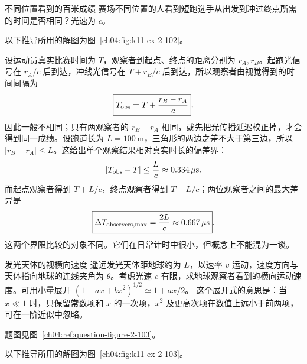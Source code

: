 {\begin{origexamplebox}{不同位置看到的百米成绩}\label{ch04:ex:k11-2-102}
赛场不同位置的人看到短跑选手从出发到冲过终点所需的时间是否相同？光速为 $c$。

\begin{qualityfigure}
\label{mech:04:102:q}
\end{qualityfigure}
\end{origexamplebox}
\begin{xesolution}
以下推导所用的解图为图~\ref{ch04:fig:k11-ex-2-102}。

设运动员真实比赛时间为 $T$，观察者到起点、终点的距离分别为 $r_A,r_B$。起跑光信号在 $r_A/c$ 后到达，冲线光信号在 $T+r_B/c$ 后到达，所以观察者由视觉得到的时间间隔为
\LightTimingDiagram
\[
\boxed{T_{\rm obs}=T+\frac{r_B-r_A}{c}}.
\]
因此一般不相同；只有两观察者的 $r_B-r_A$ 相同，或先把光传播延迟校正掉，才会得到同一成绩。设跑道长为 $L=100\,\mathrm m$，三角形的两边之差不大于第三边，所以 $|r_B-r_A|\le L$。这给出单个观察结果相对真实时长的偏差界：
\[
|T_{\rm obs}-T|\le\frac Lc\approx0.334\,\mu\mathrm s.
\]
而起点观察者得到 $T+L/c$，终点观察者得到 $T-L/c$；两位观察者之间的最大差异是
\[
\boxed{\Delta T_{\rm observers,max}=\frac{2L}{c}\approx0.667\,\mu\mathrm s}.
\]
这两个界限比较的对象不同。它们在日常计时中很小，但概念上不能混为一谈。
\end{xesolution}


\begin{origexamplebox}{发光天体的视横向速度}\label{ch04:ex:k11-2-103}
遥远发光天体距地球约为 $L$，以速率 $v$ 运动，速度方向与天体指向地球的连线夹角为 $\theta$。考虑光速 $c$ 有限，求地球观察者看到的横向运动速度。可用小量展开 $(1+ax+bx^2)^{1/2}\simeq1+ax/2$。
这个展开式的意思是：当 $x\ll1$ 时，只保留常数项和 $x$ 的一次项，$x^2$ 及更高次项在数值上远小于前两项，可在一阶近似中忽略。
\par 题图见图~\ref{ch04:ref:question-figure-2-103}。
\KQuestionDZ
\end{origexamplebox}
\begin{xesolution}
以下推导所用的解图为图~\ref{ch04:fig:k11-ex-2-103}。


\end{xesolution}}
